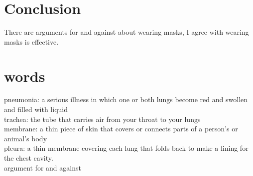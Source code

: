 \documentclass{article}
\begin{document}
\section{Conclusion}
There are arguments for and against about wearing masks, I agree with wearing masks is effective. 


\section{words}
pneumonia: a serious illness in which one or both lungs become red and swollen and filled with liquid\\
trachea: the tube that carries air from your throat to your lungs\\
membrane: a thin piece of skin that covers or connects parts of a person's or animal's body\\
pleura: a thin membrane covering each lung that folds back to make a lining for the chest cavity.\\
argument for and against
\end{document}
